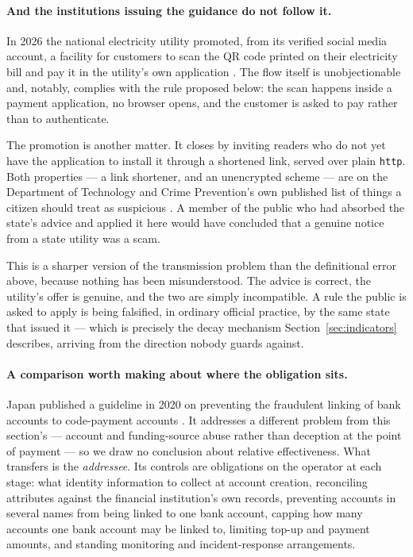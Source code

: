 \documentclass[10pt,a4paper,twocolumn]{article}
\newcommand{\code}[1]{\texttt{\small #1}}
\begin{document}
\paragraph{And the institutions issuing the guidance do not follow it.}
In 2026 the national electricity utility promoted, from its verified social
media account, a facility for customers to scan the QR code printed on their
electricity bill and pay it in the utility's own application
\citep{edc2026qrbill}. The flow itself is unobjectionable and, notably, complies
with the rule proposed below: the scan happens inside a payment application, no
browser opens, and the customer is asked to pay rather than to authenticate.

The promotion is another matter. It closes by inviting readers who do not yet
have the application to install it through a shortened link, served over plain
\code{http}. Both properties --- a link shortener, and an unencrypted scheme ---
are on the Department of Technology and Crime Prevention's own published list of
things a citizen should treat as suspicious \citep{khmertimes2024quishing}. A
member of the public who had absorbed the state's advice and applied it here
would have concluded that a genuine notice from a state utility was a scam.

This is a sharper version of the transmission problem than the definitional
error above, because nothing has been misunderstood. The advice is correct, the
utility's offer is genuine, and the two are simply incompatible. A rule the
public is asked to apply is being falsified, in ordinary official practice, by
the same state that issued it --- which is precisely the decay mechanism
Section~\ref{sec:indicators} describes, arriving from the direction nobody
guards against.

\paragraph{A comparison worth making about where the obligation sits.} Japan
published a guideline in 2020 on preventing the fraudulent linking of bank
accounts to code-payment accounts \citep{jpqrfraud}. It addresses a different
problem from this section's --- account and funding-source abuse rather than
deception at the point of payment --- so we draw no conclusion about relative
effectiveness. What transfers is the \emph{addressee}. Its controls are
obligations on the operator at each stage: what identity information to collect
at account creation, reconciling attributes against the financial institution's
own records, preventing accounts in several names from being linked to one bank
account, capping how many accounts one bank account may be linked to, limiting
top-up and payment amounts, and standing monitoring and incident-response
arrangements.
\end{document}
